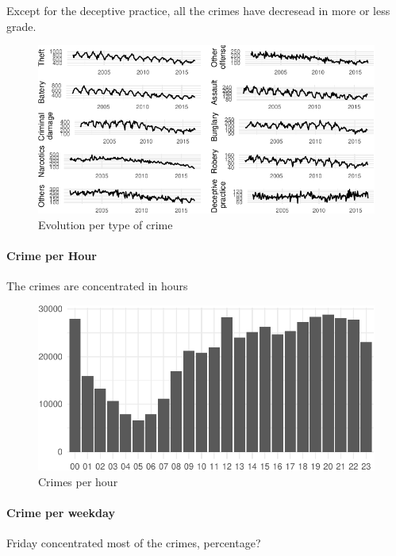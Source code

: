 \documentclass[]{article}
\let\oldparagraph\paragraph
\renewcommand{\paragraph}[1]{\oldparagraph{#1}\mbox{}}
\begin{document}
Except for the deceptive practice, all the crimes have decresead in more
or less grade.

\begin{figure}[htbp]
\centering
\includegraphics{Assessment_1v6_files/figure-latex/fig2-1.pdf}
\caption{Evolution per type of crime}
\end{figure}

\paragraph{Crime per Hour}\label{crime-per-hour}

The crimes are concentrated in hours

\begin{figure}[htbp]
\centering
\includegraphics{Assessment_1v6_files/figure-latex/fig3-1.pdf}
\caption{Crimes per hour}
\end{figure}

\paragraph{Crime per weekday}\label{crime-per-weekday}

Friday concentrated most of the crimes, percentage?
\end{document}
